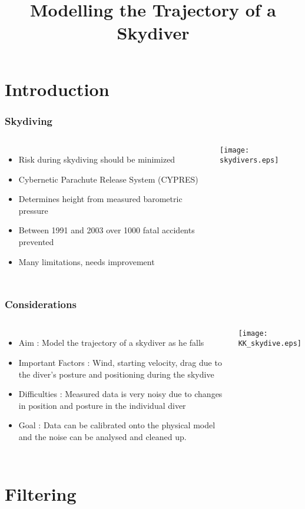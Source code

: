 \documentclass{beamer}
\title{Modelling the Trajectory of a Skydiver}
\author{}
\institute{}
\begin{document}
\begin{frame}
\titlepage
\end{frame}


\section{Introduction}

\begin{frame}
\frametitle{Skydiving}
\begin{columns}[c]
\column{3in}
\begin{itemize}
\item Risk during skydiving should
be minimized
\item Cybernetic Parachute Release
System (CYPRES)
\item Determines height from
measured barometric
pressure
\item Between 1991 and 2003 over
1000 fatal accidents
prevented
\item Many limitations, needs improvement
\end{itemize}
\column{2in}
\texttt{[image: skydivers.eps]}
\end{columns}
\end{frame}

\begin{frame}
\frametitle{Considerations}
\begin{columns}[c]
\column{3in}
\begin{itemize}
\item Aim :  Model the trajectory of a skydiver as he falls
\item Important Factors : Wind, starting velocity, drag due to the diver's posture and positioning during the skydive
\item Difficulties : Measured data is very noisy due to changes in position and posture in the individual diver
\item Goal : Data can be calibrated onto the physical model and the noise can be analysed and cleaned up.
\end{itemize}
\column{2in}
\texttt{[image: KK\_skydive.eps]}
\end{columns}
\end{frame}


\section{Filtering}
\end{document}
